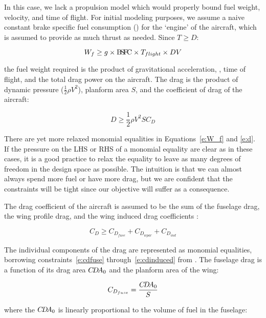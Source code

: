 In this case, we lack a propulsion model which would properly bound fuel weight, velocity,
and time of flight. For initial modeling purposes, we assume a naive constant brake
specific fuel consumption (\BSFC) for the `engine' of the aircraft, which is assumed
to provide as much thrust as needed. Since $T \geq D$:

\begin{equation}
    W_f \geq g \times {\rm B\!S\!F\!C} \times T_{flight} \times DV
    \label{e:W_f}
\end{equation}

the fuel weight required is the product of gravitational acceleration, \BSFC, time of flight, and the
total drag power on the aircraft.
The drag is the product of dynamic pressure ($\frac{1}{2} \rho V^2$),
planform area $S$, and the coefficient of drag of the aircraft:

\begin{equation}
    D \geq \frac{1}{2} \rho V^2 S C_D
    \label{e:d}
\end{equation}

There are yet more relaxed monomial equalities in Equations~\ref{e:W_f} and \ref{e:d}.
If the pressure on the \gls{LHS} or \gls{RHS} of a monomial equality are clear as in these cases,
it is a good practice to relax the equality to leave as many degrees of freedom
in the design space as possible. The intuition is that we can almost always spend more fuel or have more drag,
but we are confident that the constraints will be tight since our objective will suffer as a consequence.

The drag coefficient of the aircraft is assumed to be the sum of the fuselage drag,
the wing profile drag, and the wing induced drag coefficients \cite{gp_ac_design}:

\begin{equation}
    C_D \geq C_{D_{fuse}} + C_{D_{wpar}} + C_{D_{ind}}
\label{e:cd}
\end{equation}

The individual components of the drag are represented as monomial equalities, borrowing
constraints~\ref{e:cdfuse} through~\ref{e:cdinduced} from \cite{gp_ac_design}.
The fuselage drag is a function of its drag area $C\!D\!A_0$ and the planform area of the wing:

\begin{equation}
    C_{D_{fuse}} = \frac{C\!D\!A_0}{S}
\label{e:cdfuse}
\end{equation}

where the $C\!D\!A_0$ is linearly proportional to the volume of fuel in the fuselage:

